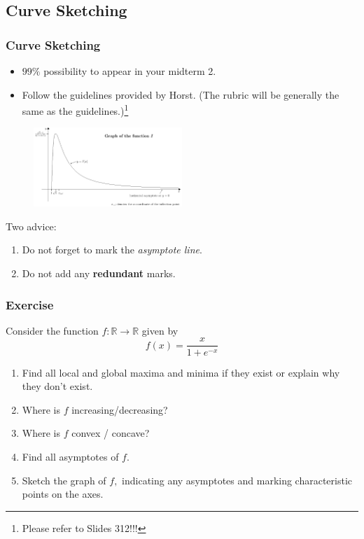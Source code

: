 \documentclass[10pt, t]{beamer}
\renewcommand{\emph}[1]{{\color{themecolor}\textsl{#1}}}
\begin{document}
\subsection{\textbf{Curve Sketching}}
\begin{frame}
    \frametitle{\textbf{Curve Sketching}}
    \begin{itemize}
        \item
              $99\%$ possibility to appear in your midterm 2.
        \item Follow the guidelines provided by Horst. (The rubric will be generally the same as the guidelines.)\footnote[frame]{Please refer to Slides 312!!!}
    \end{itemize}
    \begin{figure}[H]
        \centering
        \includegraphics[width=0.5\textwidth]{2020-11-04-12-46-58.png}
    \end{figure}
    Two advice:
    \begin{enumerate}
        \item Do not forget to mark the \emph{asymptote line}.
        \item Do not add any \textbf{redundant} marks.
    \end{enumerate}
\end{frame}

\begin{frame}
    \frametitle{Exercise}

    Consider the function $f: \mathbb{R} \rightarrow \mathbb{R}$ given by
    $$
        f(x)=\frac{x}{1+e^{-x}}
    $$
    \begin{enumerate}
        \item
              Find all local and global maxima and minima if they exist or explain why they don't exist.
        \item
              Where is $f$ increasing/decreasing?
        \item
              Where is $f$ convex / concave?
        \item
              Find all asymptotes of $f$.
        \item
              Sketch the graph of $f,$ indicating any asymptotes and marking characteristic points on the axes.
    \end{enumerate}


\end{frame}
\end{document}
